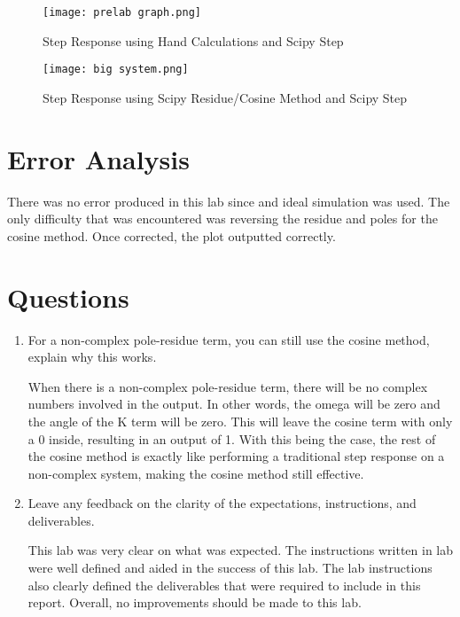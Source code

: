 \documentclass[12pt, titlepage]{article}
\begin{document}
       
       \begin{figure}[h!]
           \centering
           \texttt{[image: prelab graph.png]}
           \caption{Step Response using Hand Calculations and Scipy Step}
           \label{fig:my_label}
       \end{figure}
       
       \begin{figure}[h!]
           \centering
           \texttt{[image: big system.png]}
           \caption{Step Response using Scipy Residue/Cosine Method and Scipy Step}
           \label{fig:my_label}
       \end{figure}
        \clearpage
        
        \section{Error Analysis}
        There was no error produced in this lab since and ideal simulation was used.  The only difficulty that was encountered was reversing the residue and poles for the cosine method.  Once corrected, the plot outputted correctly.
        
        
        \section{Questions}
        \begin{enumerate}
            \item For a non-complex pole-residue term, you can still use the cosine method, explain why this works.
            
            When there is a non-complex pole-residue term, there will be no complex numbers involved in the output.  In other words, the omega will be zero and the angle of the K term will be zero.  This will leave the cosine term with only a 0 inside, resulting in an output of 1.  With this being the case, the rest of the cosine method is exactly like performing a traditional step response on a non-complex system, making the cosine method still effective.
            
            \item Leave any feedback on the clarity of the expectations, instructions, and deliverables.
            
            This lab was very clear on what was expected.  The instructions written in lab were well defined and aided in the success of this lab.  The lab instructions also clearly defined the deliverables that were required to include in this report.  Overall, no improvements should be made to this lab.
        \end{enumerate}
        
\end{document}
